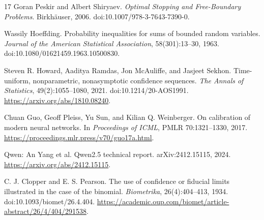 \begin{thebibliography}{17}
Goran Peskir and Albert Shiryaev.
\emph{Optimal Stopping and Free-Boundary Problems}.
Birkh\"auser, 2006.
doi:10.1007/978-3-7643-7390-0.

Wassily Hoeffding.
Probability inequalities for sums of bounded random variables.
\emph{Journal of the American Statistical Association}, 58(301):13--30, 1963.
doi:10.1080/01621459.1963.10500830.

Steven R. Howard, Aaditya Ramdas, Jon McAuliffe, and Jasjeet Sekhon.
Time-uniform, nonparametric, nonasymptotic confidence sequences.
\emph{The Annals of Statistics}, 49(2):1055--1080, 2021.
doi:10.1214/20-AOS1991.
\url{https://arxiv.org/abs/1810.08240}.

Chuan Guo, Geoff Pleiss, Yu Sun, and Kilian Q. Weinberger.
On calibration of modern neural networks.
In \emph{Proceedings of ICML}, PMLR 70:1321--1330, 2017.
\url{https://proceedings.mlr.press/v70/guo17a.html}.

Qwen: An Yang et al.
Qwen2.5 technical report.
arXiv:2412.15115, 2024.
\url{https://arxiv.org/abs/2412.15115}.

C. J. Clopper and E. S. Pearson.
The use of confidence or fiducial limits illustrated in the case of the binomial.
\emph{Biometrika}, 26(4):404--413, 1934.
doi:10.1093/biomet/26.4.404.
\url{https://academic.oup.com/biomet/article-abstract/26/4/404/291538}.

\end{thebibliography}
